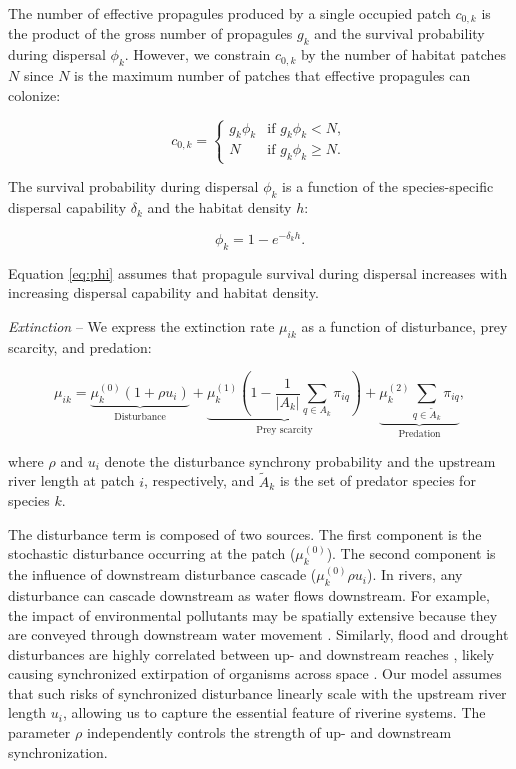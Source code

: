 \documentclass[11pt, class=article, crop=false]{standalone}
\theoremstyle{definition}
\begin{document}
The number of effective propagules produced by a single occupied patch $c_{0, k}$ is the product of the gross number of propagules $g_{k}$ and the survival probability during dispersal $\phi_k$.
However, we constrain $c_{0, k}$ by the number of habitat patches $N$ since $N$ is the maximum number of patches that effective propagules can colonize:

\begin{equation}
    c_{0, k} = 
    \begin{cases}
        g_k \phi_k & \text{if $g_k \phi_k < N$},\\
        N & \text{if $g_k \phi_k \ge N$}.
    \end{cases}
    \label{eq:c0-prod}
\end{equation}

The survival probability during dispersal $\phi_k$ is a function of the species-specific dispersal capability $\delta_k$ and the habitat density $h$:

\begin{equation}
    \phi_k = 1 - e^{-\delta_k h}.
    \label{eq:phi}
\end{equation}

Equation \ref{eq:phi} assumes that propagule survival during dispersal increases with increasing dispersal capability and habitat density.

\textit{Extinction} -- 
We express the extinction rate $\mu_{ik}$ as a function of disturbance, prey scarcity, and predation:

\begin{equation}
    \mu_{ik} = 
        \underbrace{\mu_{k}^{(0)} (1 + \rho u_i)}_{\text{Disturbance}} + 
        \underbrace{\mu_{k}^{(1)} \left(1 - \frac{1}{|A_k|}\sum_{q \in A_k} \pi_{iq} \right)}_{\text{Prey scarcity}} + 
        \underbrace{\mu_{k}^{(2)} \sum_{q \in \tilde{A}_k} \pi_{iq}}_{\text{Predation}},
    \label{eq:extn-local}
\end{equation}

where $\rho$ and $u_i$ denote the disturbance synchrony probability and the upstream river length at patch $i$, respectively, and $\tilde{A}_k$ is the set of predator species for species $k$.

The disturbance term is composed of two sources.
The first component is the stochastic disturbance occurring at the patch ($\mu_{k}^{(0)}$).
The second component is the influence of downstream disturbance cascade ($\mu_{k}^{(0)} \rho u_i$).
In rivers, any disturbance can cascade downstream as water flows downstream.
For example, the impact of environmental pollutants may be spatially extensive because they are conveyed through downstream water movement \cite{massoudieh_biogeochemical_2010}.
Similarly, flood and drought disturbances are highly correlated between up- and downstream reaches \cite{swanson_flood_1998, nakamura_disturbance_2000, sarremejane_drought_2021}, likely causing synchronized extirpation of organisms across space \cite{larsen_geography_2021}.
Our model assumes that such risks of synchronized disturbance linearly scale with the upstream river length $u_i$, allowing us to capture the essential feature of riverine systems.
The parameter $\rho$ independently controls the strength of up- and downstream synchronization.
\end{document}
